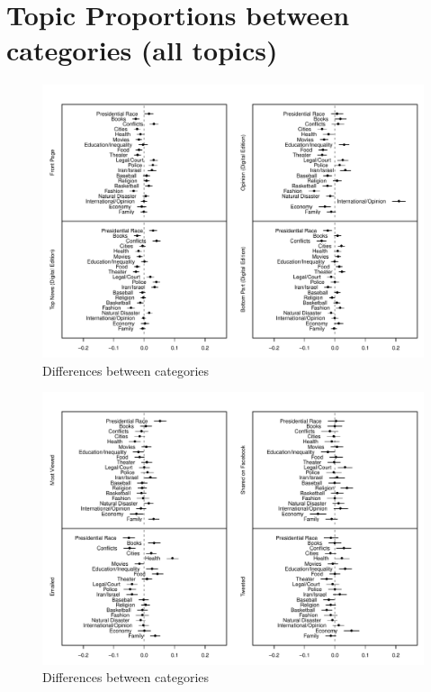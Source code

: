 \documentclass[12pt]{article}
\begin{document}
\clearpage
\footnotesize\singlespacing
\appendices

\section{Topic Proportions between categories (all topics)}\label{app:res}
\renewcommand\thefigure{\thesection.\arabic{figure}}
\renewcommand\thetable{\thesection.\arabic{table}}
\setcounter{figure}{0}
\setcounter{table}{0}

\begin{figure}[h]
\caption{Differences between categories}\label{fig:res_nyt}
\includegraphics[width=\textwidth]{../calc/fig/res_nyt} 
\end{figure}

\begin{figure}[h]
\caption{Differences between categories}\label{fig:res_share}
\includegraphics[width=\textwidth]{../calc/fig/res_share} 
\end{figure}
\end{document}
